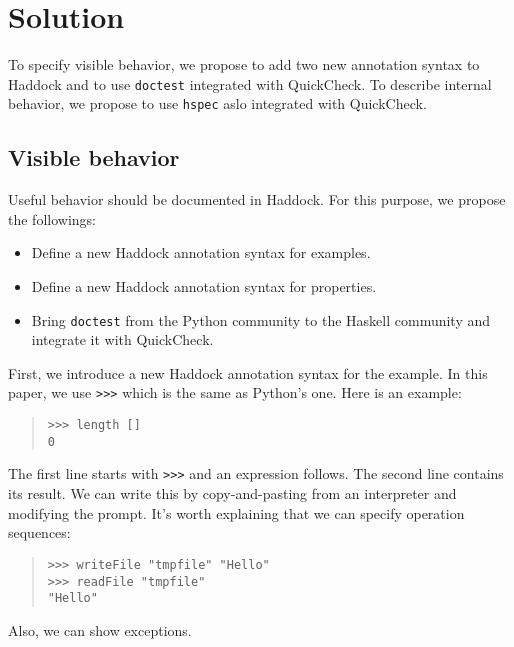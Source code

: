 \documentclass[preprint]{sigplanconf}
\begin{document}
\section{Solution}

To specify visible behavior, we propose to add two new annotation syntax to Haddock and to use {\tt doctest} integrated with QuickCheck. To describe internal behavior, we propose to use {\tt hspec} aslo integrated with QuickCheck.

\subsection{Visible behavior}

Useful behavior should be documented in Haddock. 
For this purpose, we propose the followings:

\begin{itemize}
\item Define a new Haddock annotation syntax for examples.
\item Define a new Haddock annotation syntax for properties.
\item Bring {\tt doctest} from the Python community to the Haskell
community and integrate it with QuickCheck.
\end{itemize}

First, we introduce a new Haddock annotation syntax for the example.
In this paper, we use {\tt >>>} which is the same as Python's one.
Here is an example:

\begin{quote}
\begin{verbatim}
>>> length []
0
\end{verbatim}
\end{quote}

\noindent The first line starts with {\tt >>>} and an expression follows. The second line contains its result. We can write this by copy-and-pasting from an interpreter and modifying the prompt.
It's worth explaining that we can specify operation sequences:

\begin{quote}
\begin{verbatim}
>>> writeFile "tmpfile" "Hello"
>>> readFile "tmpfile"
"Hello"
\end{verbatim}
\end{quote}

\noindent Also, we can show exceptions.
\end{document}
